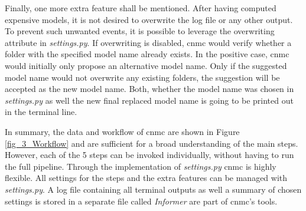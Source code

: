 Finally, one more extra feature shall be mentioned. After having computed expensive models, it is not desired to overwrite the log file or any other output. 
To prevent such unwanted events, it is possible to leverage the overwriting attribute in \emph{settings.py}. If overwriting is disabled, \gls{cnmc} would verify whether a folder with the specified model name already exists. 
In the positive case, \gls{cnmc} would initially only propose an alternative model name. Only if the suggested model name would not overwrite any existing folders, the suggestion will be accepted as the new model name. 
Both, whether the model name was chosen in \emph{settings.py} as well the new final replaced model name is going to be printed out in the terminal line.\newline 

In summary, the data and workflow of \gls{cnmc} are shown in Figure \ref{fig_3_Workflow} and are sufficient for a broad understanding of the main steps.
However, each of the 5 steps can be invoked individually, without having to run the full pipeline. Through the implementation of \emph{settings.py} \gls{cnmc} is highly flexible. All settings for the steps and the extra features can be managed with \emph{settings.py}. 
A log file containing all terminal outputs as well a summary of chosen settings is stored in a separate file called \emph{Informer} are part of \gls{cnmc}'s tools.

